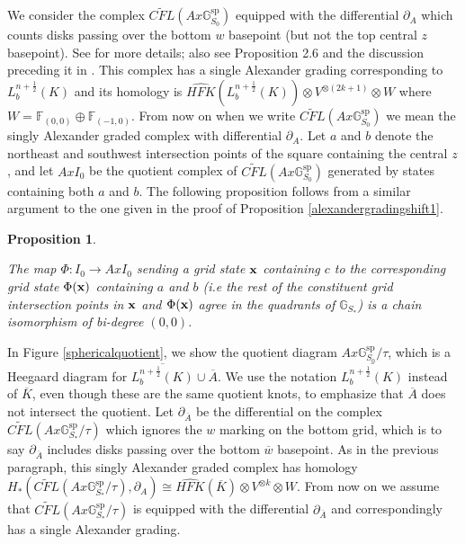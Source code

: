 \documentclass[11pt]{amsart}
\newtheorem{proposition}[theorem]{Proposition}
\theoremstyle{definition}
\theoremstyle{remark}
\def\F{\mathbb{F}}
\def\HFK {\mathit{HFK}}
\newcommand\HFKhat{\widehat{\HFK}}
\numberwithin{equation}{section}
\begin{document}
We consider the complex $\widetilde{CFL}(Ax\mathbb{G}_{S_0}^{\textrm{sp}})$ equipped with the differential $\partial_A$ which counts disks passing over the bottom $w$ basepoint (but not the top central $z$ basepoint). See \cite[~Propostion 7.1]{OSlink} for more details; also see Proposition 2.6 and the discussion preceding it in \cite{HendricksDP}. This complex has a single Alexander grading corresponding to $L^{n+\frac{1}{2}}_b(K)$ and its homology is $\HFKhat(L_b^{n+\frac{1}{2}}(K))\otimes V^{\otimes (2k+1)}\otimes W$ where $W=\F_{(0,0)}\oplus \F_{(-1,0)}$. From now on when we write $\widetilde{CFL}(Ax\mathbb{G}_{S_0}^{\textrm{sp}})$ we mean the singly Alexander graded complex with differential $\partial_A$. Let $a$ and $b$ denote the northeast and southwest intersection points of the square containing the central $z$, and let $AxI_0$ be the quotient complex of $\widetilde{CFL}(Ax\mathbb{G}_{S_0}^{\textrm{sp}})$ generated by states containing both $a$ and $b$. The following proposition follows from a similar argument to the one given in the proof of Proposition \ref{alexandergradingshift1}. 
\begin{proposition}\label{alexandergradingstatement2}

The map $\Phi\colon I_0\to AxI_0$ sending a grid state $\bf{x}$ containing $c$ to the corresponding grid state $\Phi(\bf{x})$ containing $a$ and $b$ (i.e the rest of the constituent grid intersection points in $\bf{x}$ and $\Phi(\bf{x})$ agree in the quadrants of $\mathbb{G}_{S_*}$) is a chain isomorphism of bi-degree $(0,0)$. 
     
\end{proposition}


 In Figure \ref{sphericalquotient}, we show the quotient diagram $Ax\mathbb{G}_{S_0}^{\textrm{sp}}/\tau$, which is a Heegaard diagram for $\overline{L_b^{n+\frac{1}{2}}(K)}\cup \overline{A}$. We use the notation $\overline{L_b^{n+\frac{1}{2}}(K)}$ instead of $\overline{K}$, even though these are the same quotient knots, to emphasize that $\overline{A}$ does not intersect the quotient. Let $\partial_{\overline{A}}$ be the differential on the complex $\widetilde{CFL}(Ax\mathbb{G}_{S_*}^{\textrm{sp}}/\tau)$ which ignores the $w$ marking on the bottom grid, which is to say $\partial_{\overline{A}}$ includes disks passing over the bottom $\overline{w}$ basepoint. As in the previous paragraph, this singly Alexander graded complex has homology $H_*(\widetilde{CFL}(Ax\mathbb{G}_{S_*}^{\textrm{sp}}/\tau),\partial_A)\cong \HFKhat(\overline{K})\otimes V^{\otimes k}\otimes W$. From now on we assume that $\widetilde{CFL}(Ax\mathbb{G}_{S_*}^{\textrm{sp}}/\tau)$ is equipped with the differential $\partial_{\overline{A}}$ and correspondingly has a single Alexander grading.
 
\end{document}
